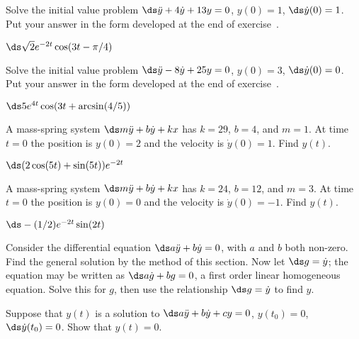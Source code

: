 \begin{exercises}
\exercise Solve the initial value problem 
$\ds\ddot y+4\dot y+13y=0$,
$y(0)=1$, $\ds\dot y(0)=1$. Put your answer in the form developed
at the end of exercise~.
\begin{answer} $\ds \sqrt2 e^{-2t}\cos(3t-\pi/4)$
\end{answer}
\exercise Solve the initial value problem 
$\ds\ddot y-8\dot y+25y=0$,
$y(0)=3$, $\ds\dot y(0)=0$. Put your answer in the form developed
at the end of exercise~.
\begin{answer} $\ds 5e^{4t}\cos(3t+\arcsin(4/5))$
\end{answer}
\exercise A mass-spring system $\ds m\ddot y+b\dot y+kx$ has
$k=29$, $b=4$, and $m=1$. At time $t=0$ the position is $y(0)=2$ and
the velocity is $\dot y(0)=1$. Find $y(t)$.
\begin{answer} $\ds (2\cos(5t)+\sin(5t))e^{-2t}$
\end{answer}
\exercise A mass-spring system $\ds m\ddot y+b\dot y+kx$ has
$k=24$, $b=12$, and $m=3$. At time $t=0$ the position is $y(0)=0$ and
the velocity is $\dot y(0)=-1$. Find $y(t)$.
\begin{answer} $\ds-(1/2)e^{-2t}\sin(2t)$
\end{answer}

\exercise Consider 
\label{exer:second order really first order}
the differential equation $\ds a\ddot y + b\dot
y=0$, with $a$ and $b$ both non-zero. Find the general solution by the
method of this section. Now let $\ds g=\dot y$; the equation may be
written as $\ds a\dot g+bg=0$, a first order linear homogeneous
equation. Solve this for $g$, then use the relationship $\ds g=\dot y$ to
find $y$.

\exercise Suppose that $y(t)$ is a solution to $\ds a\ddot y+b\dot
y+cy=0$, $y(t_0)=0$, $\ds\dot y(t_0)=0$. Show that $y(t)=0$.

\end{exercises}
